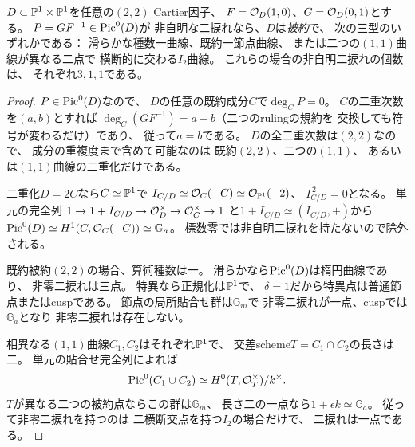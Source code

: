 \begin{lemma}[二捩れ二重壁には非被約因子とcuspidal型が現れない]
\label{lem:qa-as10-double-wall-reduced-geometries}
$D\subset\mathbb P^1\times\mathbb P^1$を任意の$(2,2)$ Cartier因子、
$F=\mathcal O_D(1,0)$、$G=\mathcal O_D(0,1)$とする。
$P=GF^{-1}\in\operatorname{Pic}^0(D)$が
非自明な二捩れなら、$D$は\emph{被約}で、
次の三型のいずれかである：
滑らかな種数一曲線、既約一節点曲線、
または二つの$(1,1)$曲線が異なる二点で
横断的に交わる$I_2$曲線。
これらの場合の非自明二捩れの個数は、
それぞれ$3,1,1$である。
\end{lemma}
\begin{proof}
$P\in\operatorname{Pic}^0(D)$なので、
$D$の任意の既約成分$C$で$\deg_C P=0$。
$C$の二重次数を$(a,b)$とすれば
$\deg_C(GF^{-1})=a-b$（二つのrulingの規約を
交換しても符号が変わるだけ）であり、
従って$a=b$である。
$D$の全二重次数は$(2,2)$なので、
成分の重複度まで含めて可能なのは
既約$(2,2)$、二つの$(1,1)$、
あるいは$(1,1)$曲線の二重化だけである。

二重化$D=2C$なら$C\simeq\mathbb P^1$で
$I_{C/D}\simeq\mathcal O_C(-C)\simeq\mathcal O_{\mathbb P^1}(-2)$、
$I_{C/D}^{\,2}=0$となる。
単元の完全列
$1\to1+I_{C/D}\to\mathcal O_D^\times\to\mathcal O_C^\times\to1$
と$1+I_{C/D}\simeq(I_{C/D},+)$から
$\operatorname{Pic}^0(D)\simeq H^1(C,\mathcal O_C(-C))\simeq\mathbb G_a$。
標数零では非自明二捩れを持たないので除外される。

既約被約$(2,2)$の場合、算術種数は一。
滑らかなら$\operatorname{Pic}^0(D)$は楕円曲線であり、
非零二捩れは三点。
特異なら正規化は$\mathbb P^1$で、
$\delta=1$だから特異点は普通節点またはcuspである。
節点の局所貼合せ群は$\mathbb G_m$で
非零二捩れが一点、cuspでは$\mathbb G_a$となり
非零二捩れは存在しない。

相異なる$(1,1)$曲線$C_1,C_2$はそれぞれ$\mathbb P^1$で、
交差scheme$T=C_1\cap C_2$の長さは二。
単元の貼合せ完全列によれば
\[
 \operatorname{Pic}^0(C_1\cup C_2)
 \simeq H^0(T,\mathcal O_T^\times)/k^\times .
\]
$T$が異なる二つの被約点ならこの群は$\mathbb G_m$、
長さ二の一点なら$1+\epsilon k\simeq\mathbb G_a$。
従って非零二捩れを持つのは
二横断交点を持つ$I_2$の場合だけで、
二捩れは一点である。
\end{proof}

